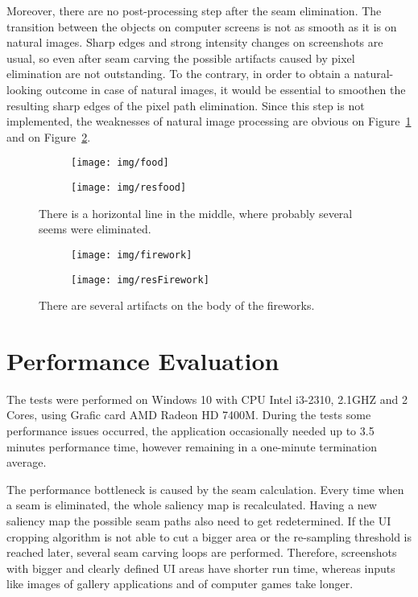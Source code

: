 \documentclass[draft,final]{vutinfth} %
\begin{document}
	Moreover, there are no post-processing step after the seam elimination.
	The transition between the objects on computer screens is not as smooth as it is on natural images.
	Sharp edges and strong intensity changes on screenshots are usual, so even after seam carving the possible artifacts caused by pixel elimination are not outstanding. 
	To the contrary, in order to obtain a natural-looking outcome in case of natural images, it would be essential to smoothen the resulting sharp edges of the pixel path elimination. 
	Since this step is not implemented, the weaknesses of natural image processing are obvious on Figure~\ref{fig:nat:food} and on Figure~\ref{fig:nat:fire}.  
	\begin{figure}[h]
		\centering
		\begin{subfigure}[b]{0.45\columnwidth}
			\centering
			\texttt{[image: img/food]}
		\end{subfigure}
		\begin{subfigure}[b]{0.45\columnwidth}
			\centering
			\texttt{[image: img/resfood]}
		\end{subfigure}
		\caption{There is a horizontal line in the middle, where probably several seems were eliminated.}
		\label{fig:nat:food}
	\end{figure}  
	\begin{figure}[h]
		\centering
		\begin{subfigure}[b]{0.45\columnwidth}
			\centering
			\texttt{[image: img/firework]}
		\end{subfigure}
		\begin{subfigure}[b]{0.45\columnwidth}
			\centering
			\texttt{[image: img/resFirework]}
		\end{subfigure}
		\caption{There are several artifacts on the body of the fireworks.}
		\label{fig:nat:fire}
	\end{figure}    
	
	
	\section{Performance Evaluation}
	The tests were performed on Windows 10 with CPU Intel i3-2310, 2.1GHZ and 2 Cores, using Grafic card AMD Radeon HD 7400M.
	During the tests some performance issues occurred, the application occasionally needed up to 3.5 minutes performance time, however remaining in a one-minute termination average.\par 
	The performance bottleneck is caused by the seam calculation.
	Every time when a seam is eliminated, the whole saliency map is recalculated.
	Having a new saliency map the possible seam paths also need to get redetermined.
	If the UI cropping algorithm is not able to cut a bigger area or the re-sampling threshold is reached later, several seam carving loops are performed. 
	Therefore, screenshots with bigger and clearly defined UI areas have shorter run time, whereas inputs like images of gallery applications and of computer games take longer. 
	
\end{document}
